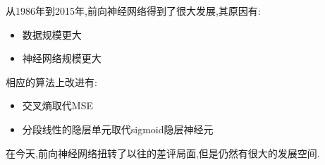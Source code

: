 从1986年到2015年,前向神经网络得到了很大发展,其原因有:
\begin{itemize}
    \item 数据规模更大
    \item 神经网络规模更大
\end{itemize}
相应的算法上改进有:
\begin{itemize}
    \item 交叉熵取代MSE
    \item 分段线性的隐层单元取代sigmoid隐层神经元
\end{itemize}

在今天,前向神经网络扭转了以往的差评局面,但是仍然有很大的发展空间.